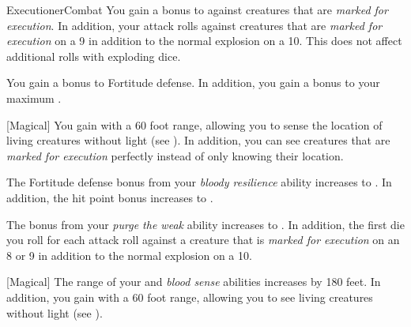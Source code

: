 \begin{feat}{Executioner}{Combat}
         You gain a  bonus to  against creatures that are \textit{marked for execution}.
        In addition, your attack rolls against creatures that are \textit{marked for execution}  on a 9 in addition to the normal explosion on a 10.
        This does not affect additional rolls with exploding dice.

         You gain a  bonus to Fortitude defense.
        In addition, you gain a  bonus to your maximum .

        [Magical] You gain  with a 60 foot range, allowing you to sense the location of living creatures without light (see ).
        In addition, you can see creatures that are \textit{marked for execution} perfectly instead of only knowing their location.

         The Fortitude defense bonus from your \textit{bloody resilience} ability increases to .
        In addition, the hit point bonus increases to .

         The bonus from your \textit{purge the weak} ability increases to .
        In addition, the first die you roll for each attack roll against a creature that is \textit{marked for execution}  on an 8 or 9 in addition to the normal explosion on a 10.

        [Magical] The range of your  and \textit{blood sense} abilities increases by 180 feet.
        In addition, you gain  with a 60 foot range, allowing you to see living creatures without light (see ).
    \end{feat}


